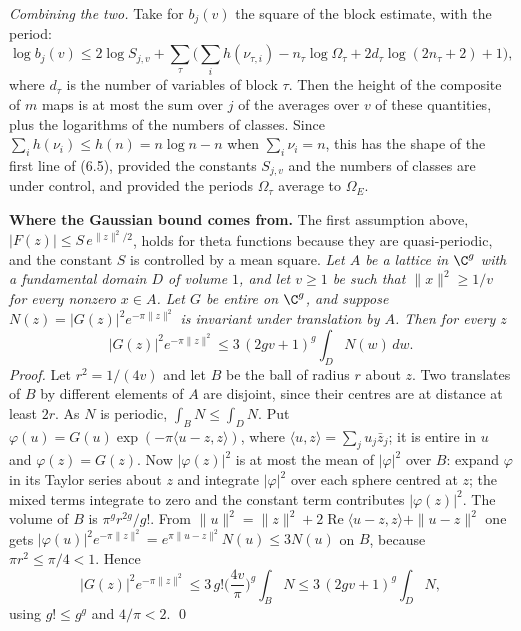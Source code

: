 \documentclass[11pt,letterpaper]{article}
\newcommand{\re}{\operatorname{Re}}
\begin{document}
\emph{Combining the two.} Take for $b_j(v)$ the square of the block estimate, with the period:
\begin{equation}\label{D:158}
 \log b_j(v)\le2\log S_{j,v}+\sum_\tau\Big(\sum_ih(\nu_{\tau,i})-n_\tau\log\Omega_\tau+2d_\tau\log(2n_\tau+2)+1\Big),
\end{equation}
where $d_\tau$ is the number of variables of block $\tau$.
Then the height of the composite of $m$ maps is at most the sum over $j$ of the averages over $v$ of these
quantities, plus the logarithms of the numbers of classes. Since $\sum_ih(\nu_i)\le h(n)=n\log n-n$ when
$\sum_i\nu_i=n$, this has the shape of the first line of (6.5), provided the constants $S_{j,v}$ and the
numbers of classes are under control, and provided the periods $\Omega_\tau$ average to $\Omega_E$.

\textbf{Where the Gaussian bound comes from.} The first assumption above, $|F(z)|\le S\,e^{\|z\|^2/2}$, holds
for theta functions because they are quasi-periodic, and the constant $S$ is controlled by a mean square.
\emph{Let $A$ be a lattice in $\C^g$ with a fundamental domain $D$ of volume $1$, and let $v\ge1$ be such that
$\|x\|^2\ge1/v$ for every nonzero $x\in A$. Let $G$ be entire on $\C^g$, and suppose
$N(z)=|G(z)|^2e^{-\pi\|z\|^2}$ is invariant under translation by $A$. Then for every $z$}
\begin{equation}\label{D:159}
 |G(z)|^2e^{-\pi\|z\|^2}\le3\,(2gv+1)^g\int_DN(w)\,dw .
\end{equation}
\emph{Proof.} Let $r^2=1/(4v)$ and let $B$ be the ball of radius $r$ about $z$. Two translates of $B$ by
different elements of $A$ are disjoint, since their centres are at distance at least $2r$. As $N$ is
periodic, $\int_BN\le\int_DN$. Put $\varphi(u)=G(u)\exp(-\pi\langle u-z,z\rangle)$, where
$\langle u,z\rangle=\sum_ju_j\bar z_j$; it is entire in $u$ and $\varphi(z)=G(z)$. Now
$|\varphi(z)|^2$ is at most the mean of $|\varphi|^2$ over $B$: expand $\varphi$ in its Taylor series about
$z$ and integrate $|\varphi|^2$ over each sphere centred at $z$; the mixed terms integrate to zero and the
constant term contributes $|\varphi(z)|^2$. The volume of $B$ is $\pi^gr^{2g}/g!$. From
$\|u\|^2=\|z\|^2+2\re\langle u-z,z\rangle+\|u-z\|^2$ one gets
$|\varphi(u)|^2e^{-\pi\|z\|^2}=e^{\pi\|u-z\|^2}N(u)\le3N(u)$ on $B$, because $\pi r^2\le\pi/4<1$. Hence
\begin{equation}\label{D:160}
 |G(z)|^2e^{-\pi\|z\|^2}\le3\,g!\Big(\frac{4v}{\pi}\Big)^g\int_BN\le3\,(2gv+1)^g\int_DN,
\end{equation}
using $g!\le g^g$ and $4/\pi<2$. \qed
\end{document}
